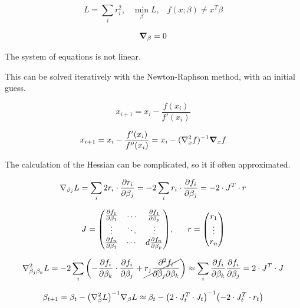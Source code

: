 \documentclass[12pt,twoside]{extarticle}
\begin{document}
\begin{equation}
    L= \sum_i r^2_i,  \,\,\,\,\, \min_\beta L, \,\,\,\,\, f(x;\beta) \neq x^T \beta
\end{equation}

\begin{equation}
    \grad_\beta=0
\end{equation}

The system of equations is not linear.

This can be solved iteratively with the Newton-Raphson method, with an initial guess.

\begin{equation}
    x_{i+1}= x_i - \frac{f(x_i)}{f'(x_i)}
\end{equation}

\begin{equation}
    x_{i+1}= x_i - \frac{f'(x_i)}{f''(x_i)}
    = x_i -(\laplacian_x f)^{-1} \grad_x f
\end{equation}

The calculation of the Hessian can be complicated, so it if often approximated.

\begin{equation}
    \nabla_{\beta_j} L = \sum_i 2r_i \cdot \pdv{r_i}{\beta_j}
    =-2\sum_i r_i \cdot \pdv{f_i}{\beta_j} = -2\cdot J^T \cdot r
\end{equation}

\begin{equation}
    J=
    \mqty(\pdv{f_1}{\beta_1} & \hdots &\pdv{f_1}{\beta_p}\\
    \vdots & \ddots & \vdots \\
    \pdv{f_n}{\beta_1} & \cdots & d\pdv{f_n}{\beta_p}), 
\,\,\,\,\,  
\,\,\,\,\,  
    r = \mqty( r_1\\ \vdots \\ r_n)
\end{equation}


\begin{equation}
    \laplacian_{\beta_j\beta_k} L = -2 \sum_i \qty(- \pdv{f_i}{\beta_k}\cdot \pdv{f_i}{\beta_j} + \cancel{ r_j \pdv{f_i}{\beta_j}{\beta_k}})  \approx \sum_i \pdv{f_i}{\beta_k}\pdv{f_i}{\beta_j} = 2\cdot J^T\cdot J
\end{equation}

\begin{equation}
    \beta_{t+1}= \beta_t - \qty(\laplacian_\beta L)^{-1} \nabla_\beta L \approx \beta_t - \qty(2\cdot J_t^T\cdot J_t)^{-1}\qty(-2 \cdot J^T_t \cdot r_t)
\end{equation}
\end{document}
